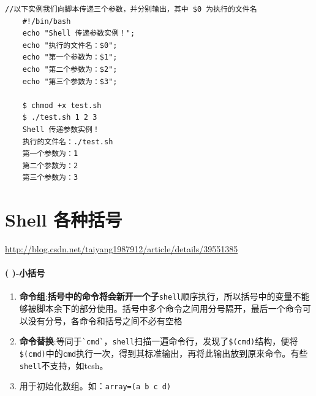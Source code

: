 \documentclass[UTF8,a4paper,12pt]{ctexbook}
\begin{document}
			 \begin{lstlisting}[xleftmargin=.06\textwidth]
	//以下实例我们向脚本传递三个参数，并分别输出，其中 $0 为执行的文件名
	#!/bin/bash	
	echo "Shell 传递参数实例！";
	echo "执行的文件名：$0";
	echo "第一个参数为：$1";
	echo "第二个参数为：$2";
	echo "第三个参数为：$3";
	
	$ chmod +x test.sh 
	$ ./test.sh 1 2 3
	Shell 传递参数实例！
	执行的文件名：./test.sh
	第一个参数为：1
	第二个参数为：2
	第三个参数为：3
			 \end{lstlisting}
			 
		\section{Shell 各种括号}
			\url{http://blog.csdn.net/taiyang1987912/article/details/39551385}
			\paragraph{( )-小括号}
				\begin{enumerate}
					\item \textbf{命令组}:\textbf{括号中的命令将会新开一个子}\verb|shell|顺序执行，所以括号中的变量不能够被脚本余下的部分使用。括号中多个命令之间用分号隔开，最后一个命令可以没有分号，各命令和括号之间不必有空格
					\item \textbf{命令替换}:等同于\verb|`cmd`|，\verb|shell|扫描一遍命令行，发现了\verb|$(cmd)|结构，便将\verb|$(cmd)|中的\verb|cmd|执行一次，得到其标准输出，再将此输出放到原来命令。有些\verb|shell|不支持，如tcsh。
					\item 用于初始化数组。如：\verb|array=(a b c d)|
				\end{enumerate}
\end{document}
